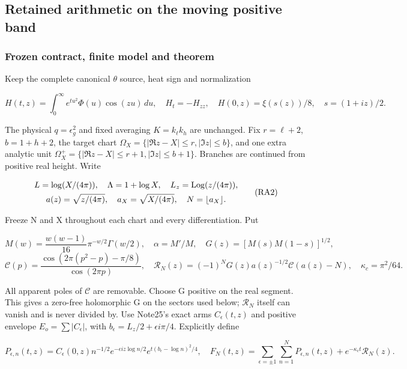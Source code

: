 \subsection{Retained arithmetic on the moving positive band}
\label{sec:retained-positive-band}
\subsubsection{Frozen contract, finite model and theorem}
\label{subsec:ra-1}

Keep the complete canonical \(\theta\) source, heat sign and normalization

\[
H(t,z)=\int_0^\infty e^{tu^2}\Phi(u)\cos(zu)\,du,
\quad H_t=-H_{zz},\quad H(0,z)=\xi(s(z))/8,
\quad s=(1+iz)/2.
\tag{RA1}\label{eq:ansatz-ra1}
\]

The physical \(q=\epsilon_{g}^{2}\) and fixed averaging \(K=k_{\ell} k_{h}\) are unchanged. Fix \(r=\ell+2\), \(b=1+h+2\), the target chart \(\Omega_X=\{|\Re z-X|\le r,|\Im z|\le b\}\), and one extra analytic unit \(\Omega_X^+=\{|\Re z-X|\le r+1,|\Im z|\le b+1\}\). Branches are continued from positive real height. Write

\[
\begin{gathered}
L=\log(X/(4\pi)),\quad\Lambda=1+\log X,\quad L_z=\operatorname{Log}(z/(4\pi)),\\
a(z)=\sqrt{z/(4\pi)},\quad a_X=\sqrt{X/(4\pi)},
\quad N=\lfloor a_X\rfloor.
\end{gathered}\tag{RA2}\label{eq:ansatz-ra2}
\]

Freeze N and X throughout each chart and every differentiation. Put

\[
M(w)=\frac{w(w-1)}{16}\pi^{-w/2}\Gamma(w/2),\quad\alpha=M'/M,
\quad G(z)=[M(s)M(1-s)]^{1/2},
\]
\[
\mathcal C(p)=\frac{\cos(2\pi(p^2-p)-\pi/8)}{\cos(2\pi p)},\quad
\mathcal R_N(z)=(-1)^NG(z)a(z)^{-1/2}\mathcal C(a(z)-N),
\quad\kappa_c=\pi^2/64.
\tag{RA3}\label{eq:ansatz-ra3}
\]

All apparent poles of $\mathcal C$ are removable. Choose G positive on the real segment. This gives a zero-free holomorphic G on the sectors used below; \(\mathcal R_N\) itself can vanish and is never divided by. Use Note25's exact arms \(C_{\epsilon}(t,z)\) and positive envelope \(E_{o}=\sum|C_{\epsilon}|\), with \(b_{\epsilon}=L_{z}/2+\epsilon i \pi/4\). Explicitly define

\[
P_{\epsilon,n}(t,z)=C_\epsilon(0,z)n^{-1/2}
 e^{-\epsilon iz\log n/2}e^{t(b_\epsilon-\log n)^2/4},\quad
F_N(t,z)=\sum_{\epsilon=\pm1}\sum_{n=1}^NP_{\epsilon,n}(t,z)
                         +e^{-\kappa_ct}\mathcal R_N(z).
\tag{RA4}\label{eq:ansatz-ra4}
\]

